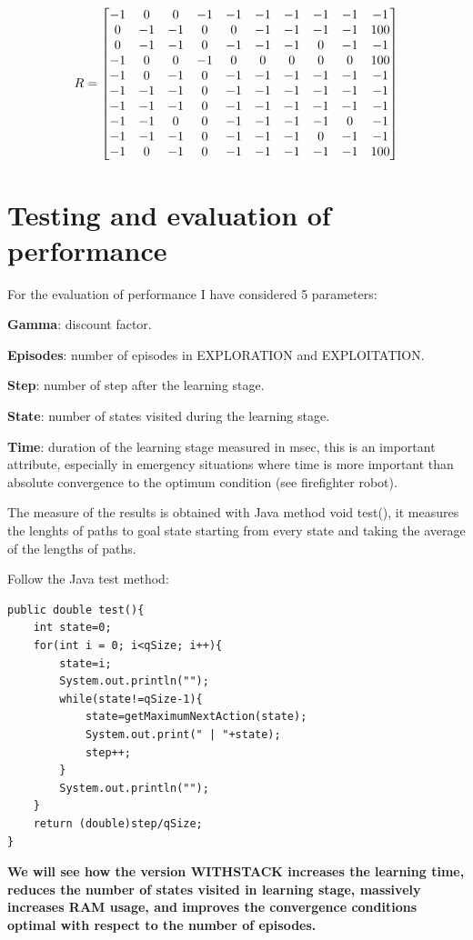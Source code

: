 \documentclass[a4paper]{article}
\begin{document}
\begin{equation}
R= \begin{bmatrix}
$$
-1 & 0 & 0 & -1 & -1 & -1 & -1 & -1 & -1 & -1 \\
0 & -1 & -1 & 0 & 0 & -1 & -1 & -1 & -1 & 100 \\
0 & -1 & -1 & 0 & -1 & -1 & -1 & 0 & -1 & -1 \\
-1 & 0 & 0 & -1 & 0 & 0 & 0 & 0 & 0 & 100 \\
-1 & 0 & -1 & 0 & -1 & -1 & -1 & -1 & -1 & -1 \\
-1 & -1 & -1 & 0 & -1 & -1 & -1 & -1 & -1 & -1 \\
-1 & -1 & -1 & 0 & -1 & -1 & -1 & -1 & -1 & -1 \\
-1 & -1 & 0 & 0 & -1 & -1 & -1 & -1 & 0 & -1 \\
-1 & -1 & -1 & 0 & -1 & -1 & -1 & 0 & -1 & -1 \\
-1 & 0 & -1 & 0 & -1 & -1 & -1 & -1 & -1 & 100
$$
\end{bmatrix}
\end{equation}
\newpage

\section{Testing and evaluation of performance}

For the evaluation of performance I have considered 5 parameters:

\textbf{Gamma}: discount factor.

\textbf{Episodes}: number of episodes in EXPLORATION and EXPLOITATION.

\textbf{Step}: number of step after the learning stage.

\textbf{State}: number of states visited during the learning stage.

\textbf{Time}: duration of the learning stage measured in msec, this is an important attribute, especially in emergency situations where time is more important than absolute convergence to the optimum condition (see firefighter robot).

The measure of the results is obtained with Java method void test(), it measures the lenghts of paths to goal state starting from every state and taking the average of the lengths of paths.

Follow the Java test method:
\begin{verbatim}
public double test(){
    int state=0;
    for(int i = 0; i<qSize; i++){
       	state=i;
       	System.out.println("");
       	while(state!=qSize-1){
    	    state=getMaximumNextAction(state);
    	    System.out.print(" | "+state);
    	    step++;
        }
      	System.out.println("");
    }
    return (double)step/qSize;
} 
\end{verbatim}
\textbf{We will see how the version WITHSTACK increases the learning time, reduces the number of states visited in learning stage, massively increases RAM usage, and improves the convergence conditions optimal with respect to the number of episodes.}
\newpage
\end{document}
